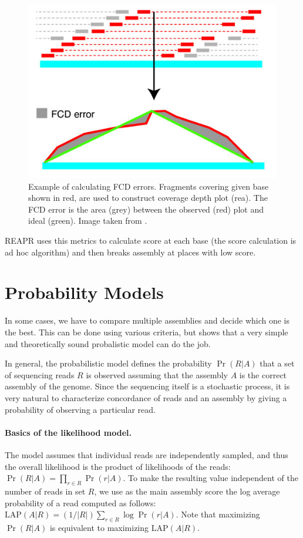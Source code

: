\begin{figure}
\centering
\includegraphics{../figures/fcd.jpg}
\caption{Example of calculating FCD errors. Fragments covering given base
shown in red, are used to construct coverage depth plot (rea). The FCD error is the
area (grey) between the observed (red) plot and ideal (green). Image taken
from \citet{Reapr}.}
\label{fig:fcd}
\end{figure}

REAPR uses this metrics to calculate score at each base 
(the score calculation is ad hoc algorithm) and then breaks assembly
at places with low score.

\section{Probability Models}
\label{sec:prob}
In some cases, we have to compare multiple assemblies and decide which one is
the best. This can be done using various criteria, but \cite{Ghodsi2013} shows
that a very simple and theoretically sound probalistic model can do the job.

In general, the probabilistic model defines the probability $\Pr(R|A)$ that a set of
sequencing reads $R$ is observed assuming that the assembly $A$ is the
correct assembly of the genome. Since the sequencing itself is a
stochastic process, it is very natural to characterize concordance of
reads and an assembly by giving a probability of observing a particular
read.

\def\LAP{\mathrm{LAP}}

\paragraph{Basics of the likelihood model.}
The model assumes
that individual reads are independently sampled, and thus the overall
likelihood is the product of likelihoods of the reads:
$\Pr(R|A) = \prod_{r\in R} \Pr(r|A).$
To make
the resulting value independent of the number of reads in set 
$R$, we use as the main
assembly score the log average probability of a read computed as
follows: $\LAP(A|R) = (1/|R|)\sum_{r\in R} \log \Pr(r|A).$ Note that
maximizing $\Pr(R|A)$ is equivalent to maximizing $\LAP(A|R)$.

